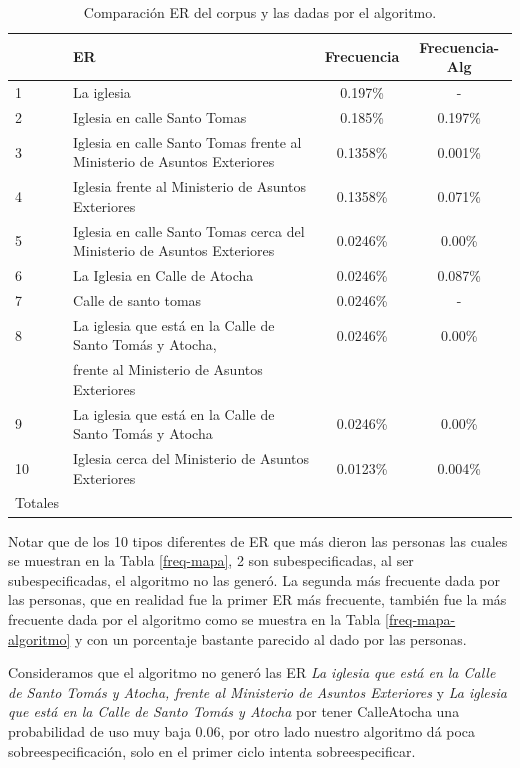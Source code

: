 \begin{table}[H]
{\footnotesize
\begin{center}
\begin{tabular}{|l|l|c|c|}
\hline
&ER 					      &  Frecuencia & Frecuencia-Alg\\ \hline \hline
1&La iglesia 								 &0.197\%  &  -\\ \hline
2&Iglesia en calle Santo Tomas						 &0.185\% 	& 0.197\%  \\ \hline
3&Iglesia en calle Santo Tomas frente al Ministerio de Asuntos Exteriores        &0.1358\% & 0.001\% \\ \hline
4&Iglesia  frente al Ministerio de Asuntos Exteriores 			 &0.1358\% & 0.071\%  \\ \hline
5&Iglesia en calle Santo Tomas cerca del Ministerio de Asuntos Exteriores        &0.0246\% & 0.00\%  \\ \hline
6&La Iglesia en Calle de Atocha							&0.0246\%  &0.087\%  \\ \hline
7&Calle de santo tomas 							&0.0246\% 	& -  \\ \hline
8&La iglesia que est\'a en la Calle de Santo Tom\'as y Atocha, 	 &0.0246\%	& 0.00\% \\ 
&frente al Ministerio de Asuntos Exteriores						 && \\ \hline
9&La iglesia que est\'a en la Calle de Santo Tom\'as y Atocha			 &0.0246\% 	& 0.00\%  \\ \hline
10&Iglesia cerca del Ministerio de Asuntos Exteriores				 &0.0123\% 	& 0.004\%  \\ \hline
Totales& &\\
\hline
\end{tabular}
\caption{Comparaci\'on ER del corpus y las dadas por el algoritmo.}\label{compara-corpus-alg}
\end{center}
}
\end{table}

Notar que de los 10 tipos diferentes de ER que m\'as dieron las personas las cuales se muestran en la Tabla \ref{freq-mapa}, 
2 son subespecificadas, al ser subespecificadas, el algoritmo no las gener\'o. 
La segunda m\'as frecuente dada por las personas, que en realidad fue la primer ER m\'as frecuente, 
tambi\'en fue la m\'as frecuente dada por el algoritmo como se muestra en la Tabla \ref{freq-mapa-algoritmo} y con un porcentaje bastante parecido
al dado por las personas. 

Consideramos que el algoritmo no gener\'o las ER {\it La iglesia que est\'a en la Calle de Santo Tom\'as y Atocha, frente al Ministerio de Asuntos Exteriores} y {\it La iglesia que est\'a en la Calle de Santo Tom\'as y Atocha} por tener CalleAtocha una probabilidad de uso muy baja 0.06, por otro lado nuestro algoritmo d\'a poca sobreespecificaci\'on, solo en el primer ciclo intenta sobreespecificar.








